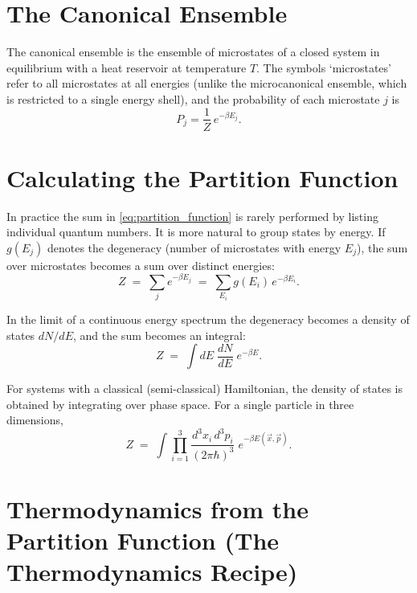 \section{The Canonical Ensemble}

\begin{definition}
The canonical ensemble is the ensemble of microstates of a closed system in equilibrium with a
heat reservoir at temperature $T$.  The symbols `microstates' refer to all microstates at all
energies (unlike the microcanonical ensemble, which is restricted to a single energy shell),
and the probability of each microstate $j$ is
\begin{equation}
    P_j = \frac{1}{Z}\,e^{-\beta E_j}.
\end{equation}
\end{definition}

\section{Calculating the Partition Function}

In practice the sum in \eqref{eq:partition_function} is rarely performed by listing individual
quantum numbers.  It is more natural to group states by energy.  If $g(E_j)$ denotes the
degeneracy (number of microstates with energy $E_j$), the sum over microstates becomes a sum
over distinct energies:
\begin{equation}
    Z \;=\; \sum_j e^{-\beta E_j}
      \;=\; \sum_{E_i} g(E_i)\,e^{-\beta E_i}.
\end{equation}

In the limit of a continuous energy spectrum the degeneracy becomes a density of states
$dN/dE$, and the sum becomes an integral:
\begin{equation}
    Z \;=\; \int dE\;\frac{dN}{dE}\;e^{-\beta E}.
\end{equation}

For systems with a classical (semi-classical) Hamiltonian, the density of states is obtained by
integrating over phase space.  For a single particle in three dimensions,
\begin{equation}
    Z \;=\; \int \prod_{i=1}^{3} \frac{d^3x_i\,d^3p_i}{(2\pi\hbar)^3}\;e^{-\beta E(\vec{x},\vec{p})}.
\end{equation}

\section{Thermodynamics from the Partition Function (The Thermodynamics Recipe)}

